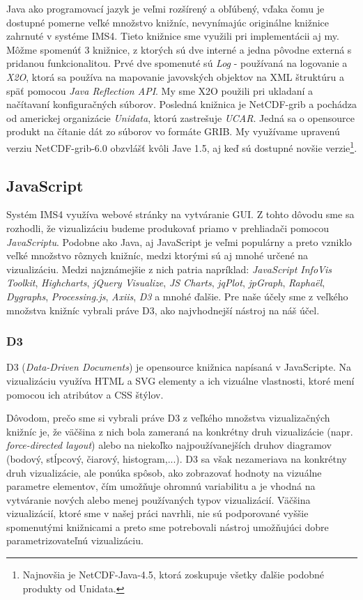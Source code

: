 Java ako programovací jazyk je veľmi rozšírený a obľúbený, vďaka čomu je dostupné pomerne veľké množstvo knižníc, nevynímajúc originálne knižnice zahrnuté v systéme IMS4. Tieto knižnice sme využili pri implementácii aj my. Môžme spomenúť 3 knižnice, z ktorých sú dve interné a jedna pôvodne externá s pridanou funkcionalitou. Prvé dve spomenuté sú \textit{Log} - používaná na logovanie a \textit{X2O}, ktorá sa používa na mapovanie javovských objektov na XML štruktúru a späť pomocou \textit{Java Reflection API}. My sme X2O použili pri ukladaní a načítavaní konfiguračných súborov. Posledná knižnica je NetCDF-grib \cite{Unidata} a pochádza od americkej organizácie \textit{Unidata}, ktorú zastrešuje \textit{UCAR}. Jedná sa o opensource produkt na čítanie dát zo súborov vo formáte GRIB. My využívame upravenú verziu NetCDF-grib-6.0 obzvlášť kvôli Jave 1.5, aj keď sú dostupné novšie verzie\footnote{Najnovšia je NetCDF-Java-4.5, ktorá zoskupuje všetky ďalšie podobné produkty od Unidata.}.

\subsection{JavaScript}
Systém IMS4 využíva webové stránky na vytváranie GUI. Z tohto dôvodu sme sa rozhodli, že vizualizáciu budeme produkovať priamo v prehliadači pomocou \textit{JavaScriptu}. Podobne ako Java, aj JavaScript je veľmi populárny a preto vzniklo veľké množstvo rôznych knižníc, medzi ktorými sú aj mnohé určené na vizualizáciu. Medzi najznámejšie z nich patria napríklad: \textit{JavaScript InfoVis Toolkit}, \textit{Highcharts}, \textit{jQuery Visualize}, \textit{JS Charts}, \textit{jqPlot}, \textit{jpGraph}, \textit{Raphaël}, \textit{Dygraphs},\textit{ Processing.js}, \textit{Axiis}, \textit{D3} a mnohé ďalšie. Pre naše účely sme z veľkého množstva knižníc vybrali práve D3, ako najvhodnejší nástroj na náš účel.

\subsubsection{D3}
D3 (\textit{Data-Driven Documents}) \cite{D3} je opensource knižnica napísaná v JavaScripte. Na vizualizáciu využíva HTML a SVG elementy a ich vizuálne vlastnosti, ktoré mení pomocou ich atribútov a CSS štýlov. 

Dôvodom, prečo sme si vybrali práve D3 z veľkého množstva vizualizačných knižníc je, že väčšina z nich bola zameraná na konkrétny druh vizualizácie (napr. \textit{force-directed layout}) alebo na niekoľko najpoužívanejších druhov diagramov (bodový, stĺpcový, čiarový, histogram,...). D3 sa však nezameriava na konkrétny druh vizualizácie, ale ponúka spôsob, ako zobrazovať hodnoty na vizuálne parametre elementov, čím umožňuje ohromnú variabilitu a je vhodná na vytváranie nových alebo menej používaných typov vizualizácií. Väčšina vizualizácií, ktoré sme v našej práci navrhli, nie sú podporované vyššie spomenutými knižnicami a preto sme potrebovali nástroj umožňujúci dobre parametrizovateľnú vizualizáciu.

